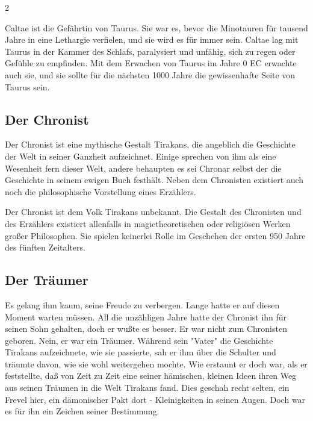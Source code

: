 \begin{multicols}{2}
{Caltae ist die Gefährtin von Taurus.
Sie war es, bevor die Minotauren für tausend Jahre in eine Lethargie verfielen, und sie wird es für immer sein.
Caltae lag mit Taurus in der Kammer des Schlafs, paralysiert und unfähig, sich zu regen oder Gefühle zu empfinden.
Mit dem Erwachen von Taurus im Jahre 0 EC erwachte auch sie, und sie sollte für die nächsten 1000 Jahre die gewissenhafte Seite von Taurus sein.

\subsection{Der Chronist}\label{subsec:der-chronist}

Der Chronist ist eine mythische Gestalt Tirakans, die angeblich die Geschichte der Welt in seiner Ganzheit aufzeichnet.
Einige sprechen von ihm als eine Wesenheit fern dieser Welt, andere behaupten es sei Chronar selbst der die Geschichte in seinem ewigen Buch festhält.
Neben dem Chronisten existiert auch noch die philosophische Vorstellung eines Erzählers.

Der Chronist ist dem Volk Tirakans unbekannt.
Die Gestalt des Chronisten und des Erzählers existiert allenfalls in magietheoretischen oder religiösen Werken großer Philosophen.
Sie spielen keinerlei Rolle im Geschehen der ersten 950 Jahre des fünften Zeitalters.

\subsection{Der Träumer}\label{subsec:der-traumer}

Es gelang ihm kaum, seine Freude zu verbergen.
Lange hatte er auf diesen Moment warten müssen.
All die unzähligen Jahre hatte der Chronist ihn für seinen Sohn gehalten, doch er wußte es besser.
Er war nicht zum Chronisten geboren.
Nein, er war ein Träumer.
Während sein "Vater" die Geschichte Tirakans aufzeichnete, wie sie passierte, sah er ihm über die Schulter und träumte davon, wie sie wohl weitergehen mochte.
Wie erstaunt er doch war, als er feststellte, daß von Zeit zu Zeit eine seiner hämischen, kleinen Ideen ihren Weg aus seinen Träumen in die Welt Tirakans fand.
Dies geschah recht selten, ein Frevel hier, ein dämonischer Pakt dort - Kleinigkeiten in seinen Augen.
Doch war es für ihn ein Zeichen seiner Bestimmung.
}{}
\end{multicols}
